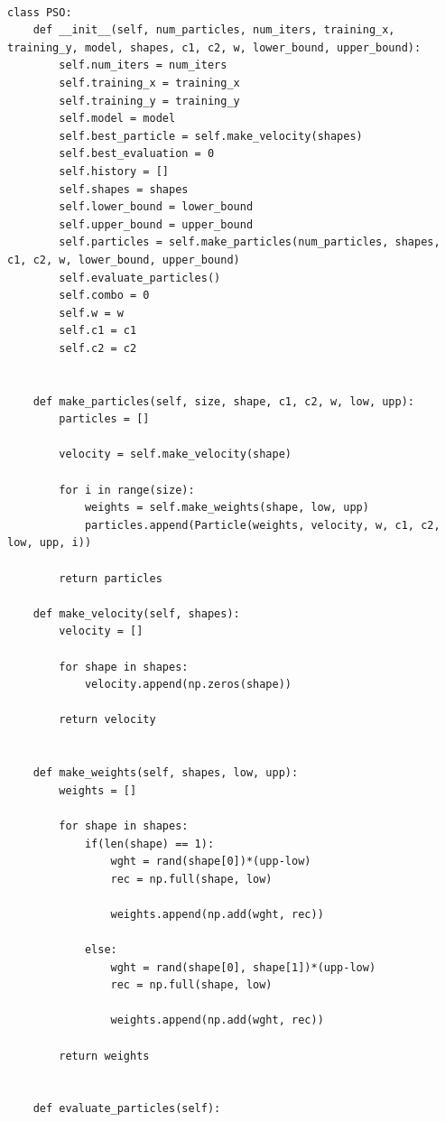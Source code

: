 \documentclass[a4paper]{article}
\begin{document}
\newpage
\begin{lstlisting}[caption={Klasa korišćena za sam algoritam},frame=single, label=simple]

class PSO:
    def __init__(self, num_particles, num_iters, training_x, training_y, model, shapes, c1, c2, w, lower_bound, upper_bound):
        self.num_iters = num_iters
        self.training_x = training_x
        self.training_y = training_y
        self.model = model
        self.best_particle = self.make_velocity(shapes)
        self.best_evaluation = 0
        self.history = []
        self.shapes = shapes
        self.lower_bound = lower_bound
        self.upper_bound = upper_bound
        self.particles = self.make_particles(num_particles, shapes, c1, c2, w, lower_bound, upper_bound)
        self.evaluate_particles()
        self.combo = 0
        self.w = w
        self.c1 = c1
        self.c2 = c2
        
        
    def make_particles(self, size, shape, c1, c2, w, low, upp):
        particles = []
        
        velocity = self.make_velocity(shape)
        
        for i in range(size):
            weights = self.make_weights(shape, low, upp)
            particles.append(Particle(weights, velocity, w, c1, c2, low, upp, i))
            
        return particles
    
    def make_velocity(self, shapes):
        velocity = []
        
        for shape in shapes:
            velocity.append(np.zeros(shape))
        
        return velocity
                
        
    def make_weights(self, shapes, low, upp):
        weights = []
        
        for shape in shapes:
            if(len(shape) == 1):
                wght = rand(shape[0])*(upp-low)
                rec = np.full(shape, low)
                
                weights.append(np.add(wght, rec))
                
            else:
                wght = rand(shape[0], shape[1])*(upp-low)
                rec = np.full(shape, low)
                
                weights.append(np.add(wght, rec))
                
        return weights
        
        
    def evaluate_particles(self):
        

\end{lstlisting}
\end{document}
